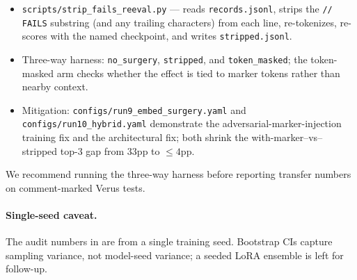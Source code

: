 \documentclass[10pt]{article}
\begin{document}
\begin{itemize}[leftmargin=*,itemsep=2pt,topsep=2pt]
\item \texttt{scripts/strip\_fails\_reeval.py} --- reads
  \texttt{records.jsonl}, strips the \texttt{// FAILS} substring (and
  any trailing characters) from each line, re-tokenizes, re-scores
  with the named checkpoint, and writes \texttt{stripped.jsonl}.
\item Three-way harness: \texttt{no\_surgery}, \texttt{stripped}, and
  \texttt{token\_masked}; the token-masked arm checks whether the
  effect is tied to marker tokens rather than nearby context.
\item Mitigation: \texttt{configs/run9\_embed\_surgery.yaml} and
  \texttt{configs/run10\_hybrid.yaml} demonstrate the
  adversarial-marker-injection training fix and the architectural
  fix; both shrink the with-marker--vs--stripped top-3 gap from
  $33$pp to $\le 4$pp.
\end{itemize}

We recommend running the three-way harness before reporting transfer
numbers on comment-marked Verus tests.

\paragraph{Single-seed caveat.}
The audit numbers in  are from a
single training seed. Bootstrap CIs capture sampling variance, not
model-seed variance; a seeded LoRA ensemble is left for follow-up.
\end{document}
